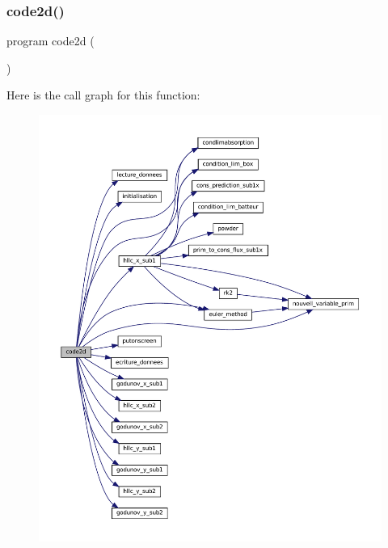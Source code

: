 \subsubsection{\texorpdfstring{code2d()}{code2d()}}
{\footnotesize\ttfamily program code2d (\begin{DoxyParamCaption}{ }\end{DoxyParamCaption})}

Here is the call graph for this function\+:
\nopagebreak
\begin{figure}[H]
\begin{center}
\leavevmode
\includegraphics[width=350pt]{main2Dv1_8f90_a8712173bc20143ca5b1b8cbd782b563e_cgraph}
\end{center}
\end{figure}
\mbox{\label{main2Dv1_8f90_ae64974281df2d6f2222187665fd79e38}} 
